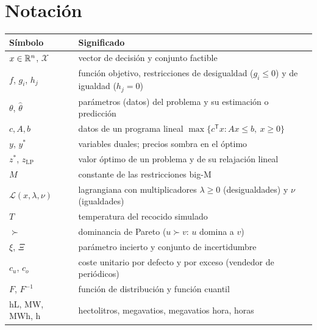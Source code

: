 \documentclass[11pt,a4paper,twoside,openany]{book}
\newcommand{\T}{^{\mathsf{T}}}
\newcommand{\Lag}{\mathcal{L}}
\begin{document}
\section*{Notación}
\begin{center}\small
\begin{tabularx}{\textwidth}{@{}l>{\raggedright\arraybackslash}X@{}}
\toprule
Símbolo & Significado \\
\midrule
$x\in\mathbb{R}^{n}$, $\mathcal{X}$ & vector de decisión y conjunto factible \\
$f$, $g_i$, $h_j$ & función objetivo, restricciones de desigualdad ($g_i\le 0$) y de igualdad ($h_j=0$) \\
$\theta$, $\hat\theta$ & parámetros (datos) del problema y su estimación o predicción \\
$c,A,b$ & datos de un programa lineal $\max\{c\T x: Ax\le b,\ x\ge 0\}$ \\
$y$, $y^{*}$ & variables duales; precios sombra en el óptimo \\
$z^{*}$, $z_{\mathrm{LP}}$ & valor óptimo de un problema y de su relajación lineal \\
$M$ & constante de las restricciones big-M \\
$\Lag(x,\lambda,\nu)$ & lagrangiana con multiplicadores $\lambda\ge 0$ (desigualdades) y $\nu$ (igualdades) \\
$T$ & temperatura del recocido simulado \\
$\succ$ & dominancia de Pareto ($u\succ v$: $u$ domina a $v$) \\
$\xi$, $\Xi$ & parámetro incierto y conjunto de incertidumbre \\
$c_u$, $c_o$ & coste unitario por defecto y por exceso (vendedor de periódicos) \\
$F$, $F^{-1}$ & función de distribución y función cuantil \\
hL, MW, MWh, h & hectolitros, megavatios, megavatios hora, horas \\
\bottomrule
\end{tabularx}
\end{center}


\tableofcontents

\mainmatter







\backmatter

\end{document}
